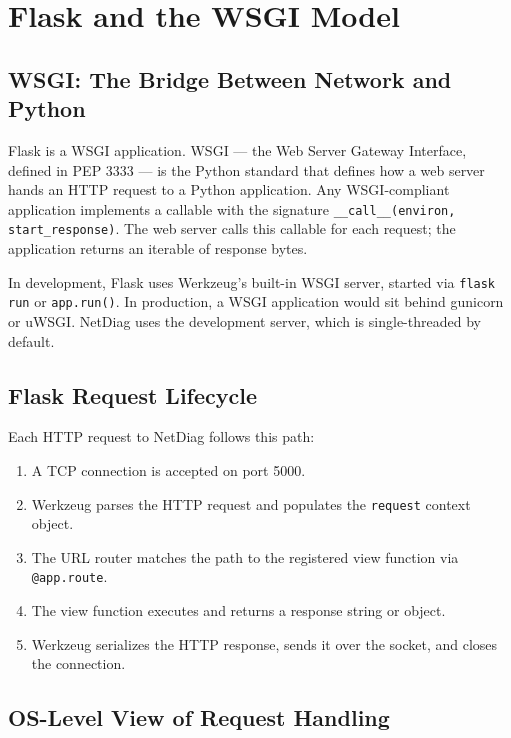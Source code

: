 \section{Flask and the WSGI Model}

\subsection{WSGI: The Bridge Between Network and Python}

Flask is a WSGI application. WSGI --- the Web Server Gateway Interface, defined in PEP 3333 --- is the Python standard that defines how a web server hands an HTTP request to a Python application. Any WSGI-compliant application implements a callable with the signature \texttt{\_\_call\_\_(environ, start\_response)}. The web server calls this callable for each request; the application returns an iterable of response bytes.

In development, Flask uses Werkzeug's built-in WSGI server, started via \texttt{flask run} or \texttt{app.run()}. In production, a WSGI application would sit behind gunicorn or uWSGI. NetDiag uses the development server, which is single-threaded by default.

\subsection{Flask Request Lifecycle}

Each HTTP request to NetDiag follows this path:

\begin{enumerate}
    \item A TCP connection is accepted on port 5000.
    \item Werkzeug parses the HTTP request and populates the \texttt{request} context object.
    \item The URL router matches the path to the registered view function via \texttt{@app.route}.
    \item The view function executes and returns a response string or object.
    \item Werkzeug serializes the HTTP response, sends it over the socket, and closes the connection.
\end{enumerate}

\subsection{OS-Level View of Request Handling}

